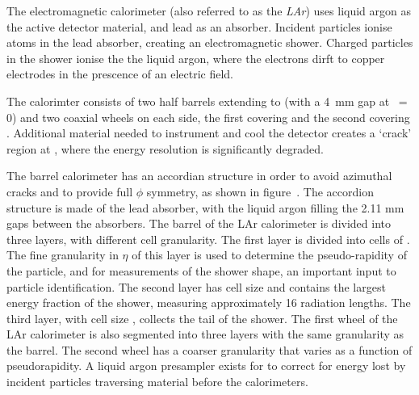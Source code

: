 The electromagnetic calorimeter (also referred to as the {\it LAr}) uses liquid
argon as the active detector material, and lead as an absorber. Incident
particles ionise atoms in the lead absorber, creating an electromagnetic shower.
Charged particles in the shower ionise the the liquid argon, where the electrons
dirft to copper electrodes in the prescence of an electric field.

The calorimter consists of two half barrels extending to  (with
a 4~mm gap at \z\ = 0) and two coaxial wheels on each side, the first covering
 and the second covering .
Additional material needed to instrument and cool the detector creates a `crack'
region at , where the energy resolution is
significantly degraded.

The barrel calorimeter has an accordian structure in order to avoid azimuthal
cracks and to provide full $\phi$ symmetry, as shown in
figure~. The accordion structure is made of
the lead absorber, with the liquid argon filling the 2.11 mm gaps between the
absorbers. The barrel of the LAr calorimeter is divided into three layers, with
different cell granularity. The first layer is divided into cells of 
. The fine granularity in $\eta$ of this layer
is used to determine the pseudo-rapidity of the particle, and for measurements
of the shower shape, an important input to particle identification. The
second layer has cell size  and contains the
largest energy fraction of the shower, measuring approximately 16 radiation 
lengths. The third layer, with cell size , collects
the tail of the shower. The first wheel of the LAr calorimeter is also segmented into
three layers with the same granularity as the barrel. The second wheel has a
coarser granularity that varies as a function of pseudorapidity. A liquid argon
presampler exists for  to correct for energy lost by incident
particles traversing material before the calorimeters.


